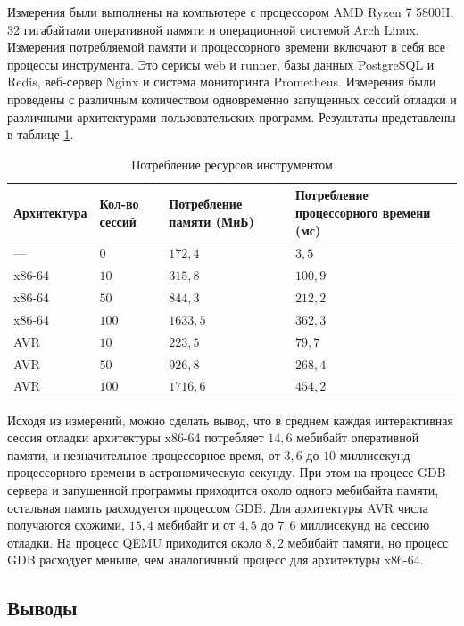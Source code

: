 \documentclass[a4paper,article,14pt]{extarticle}
\begin{document}
Измерения были выполнены на компьютере с процессором AMD Ryzen 7 5800H, 32 гигабайтами оперативной памяти и операционной системой Arch Linux. Измерения потребляемой памяти и процессорного времени включают в себя все процессы инструмента. Это серисы web и runner, базы данных PostgreSQL и Redis, веб-сервер Nginx и система мониторинга Prometheus. Измерения были проведены с различным количеством одновременно запущенных сессий отладки и различными архитектурами пользовательских программ. Результаты представлены в таблице \ref{table:measurements}.

\begin{center}
\small
    \begin{longtable}{|p{3cm}|p{2cm}|p{5cm}|p{5cm}|}
    \caption{Потребление ресурсов инструментом}\label{table:measurements} \\
    \hline
    \textbf{Архитектура} & \textbf{Кол-во сессий} & \textbf{Потребление памяти (МиБ)} & \textbf{Потребление процессорного времени (мс)} \\
    \hline
    --- & $0$ & $172{,}4$ & $3{,}5$ \\ \hline
    x86-64 & $10$ & $315{,}8$ & $100{,}9$ \\ \hline
    x86-64 & $50$ & $844{,}3$ & $212{,}2$ \\ \hline
    x86-64 & $100$ & $1633{,}5$ & $362{,}3$ \\ \hline
    AVR & $10$ & $223{,}5$ & $79{,}7$ \\ \hline
    AVR & $50$ & $926{,}8$ & $268{,}4$ \\ \hline
    AVR & $100$ & $1716{,}6$ & $454{,}2$ \\ \hline
    \end{longtable}
\normalsize
\end{center}

Исходя из измерений, можно сделать вывод, что в среднем каждая интерактивная сессия отладки архитектуры x86-64 потребляет $14{,}6$ мебибайт оперативной памяти, и незначительное процессорное время, от $3{,}6$ до $10$ миллисекунд процессорного времени в астрономическую секунду. При этом на процесс GDB сервера и запущенной программы приходится около одного мебибайта памяти, остальная память расходуется процессом GDB. Для архитектуры AVR числа получаются схожими, $15{,}4$ мебибайт и от $4{,}5$ до $7{,}6$ миллисекунд на сессию отладки. На процесс QEMU приходится около $8{,}2$ мебибайт памяти, но процесс GDB расходует меньше, чем аналогичный процесс для архитектуры x86-64.

\subsection{Выводы}
\end{document}
